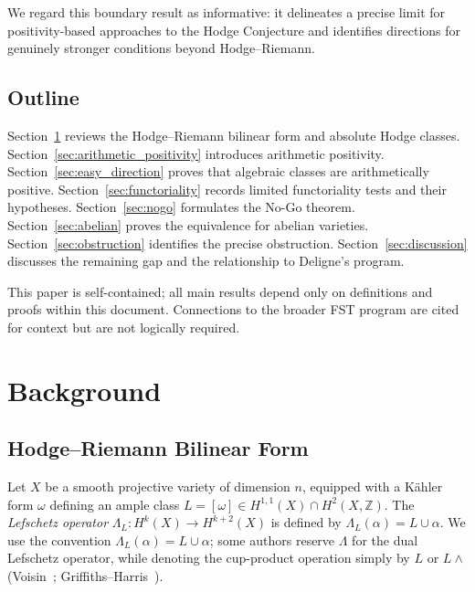 \documentclass[aps,prd,twocolumn,superscriptaddress,nofootinbib]{revtex4-2}
\theoremstyle{definition}
\theoremstyle{remark}
\begin{document}
We regard this boundary result as informative: it delineates a precise limit for positivity-based approaches to the Hodge Conjecture and identifies directions for genuinely stronger conditions beyond Hodge--Riemann.

\subsection{Outline}

Section~\ref{sec:background} reviews the Hodge--Riemann bilinear form and absolute Hodge classes. Section~\ref{sec:arithmetic_positivity} introduces arithmetic positivity. Section~\ref{sec:easy_direction} proves that algebraic classes are arithmetically positive. Section~\ref{sec:functoriality} records limited functoriality tests and their hypotheses. Section~\ref{sec:nogo} formulates the No-Go theorem. Section~\ref{sec:abelian} proves the equivalence for abelian varieties. Section~\ref{sec:obstruction} identifies the precise obstruction. Section~\ref{sec:discussion} discusses the remaining gap and the relationship to Deligne's program.

This paper is self-contained; all main results depend only on definitions and proofs within this document. Connections to the broader FST program are cited for context but are not logically required.


\section{Background}
\label{sec:background}

\subsection{Hodge--Riemann Bilinear Form}

Let $X$ be a smooth projective variety of dimension $n$, equipped with a Kähler form $\omega$ defining an ample class $L = [\omega] \in H^{1,1}(X) \cap H^2(X, \mathbb{Z})$. The \textit{Lefschetz operator} $\Lambda_L: H^k(X) \to H^{k+2}(X)$ is defined by $\Lambda_L(\alpha) = L \cup \alpha$. We use the convention $\Lambda_L(\alpha) = L \cup \alpha$; some authors reserve $\Lambda$ for the dual Lefschetz operator, while denoting the cup-product operation simply by $L$ or $L \wedge$ (Voisin~\cite{Voisin2002}; Griffiths--Harris~\cite{GH1978}).
\end{document}
